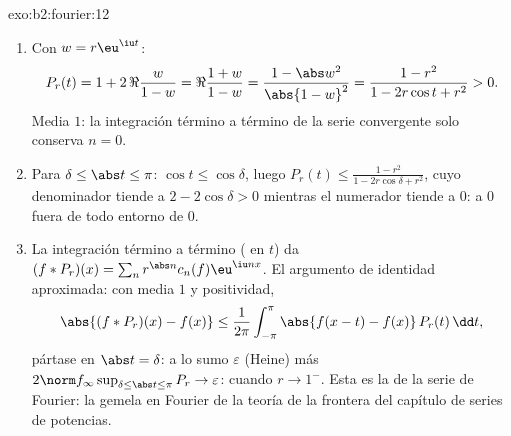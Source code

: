 \begin{solution}{exo:b2:fourier:12}
\begin{enumerate}
  \item Con $w = r\eu^{\iu t}$:
        \[
        P_r(t) = 1 + 2\,\Re\frac{w}{1 - w}
        = \Re\frac{1 + w}{1 - w}
        = \frac{1 - \abs w^2}{\abs{1 - w}^2}
        = \frac{1 - r^2}{1 - 2r\cos t + r^2} > 0 .
        \]
        Media $1$: la integración término a término de la serie
         convergente solo conserva $n = 0$.
  \item Para $\delta \leq \abs t \leq \pi$: $\cos t \leq
        \cos\delta$, luego $P_r(t) \leq \frac{1 - r^2}{1 -
        2r\cos\delta + r^2}$, cuyo denominador tiende a $2 -
        2\cos\delta > 0$ mientras el numerador tiende a $0$:
         a $0$ fuera de todo entorno de $0$.
  \item La integración término a término ( en
        $t$) da $(f * P_r)(x) = \sum_n r^{\abs n}c_n(f)\eu^{\iu
        nx}$. El argumento de identidad aproximada: con media $1$ y
        positividad,
        \[
        \abs{(f*P_r)(x) - f(x)}
        \leq \frac{1}{2\pi}\int_{-\pi}^{\pi}
        \abs{f(x-t) - f(x)}\,P_r(t)\,\dd t ,
        \]
        pártase en $\abs t = \delta$: a lo sumo $\varepsilon$
        (Heine) más $2\norm f_\infty\sup_{\delta\leq\abs
        t\leq\pi}P_r \to \varepsilon$:  cuando
        $r \to 1^-$. Esta es la  de la serie de
        Fourier: la gemela en Fourier de la teoría de la frontera
        del capítulo de series de potencias.
\end{enumerate}
\end{solution}


